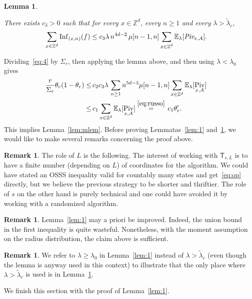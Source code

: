 \documentclass[10pt]{amsart}
\newtheorem{lemm}[theo]{Lemma}\newtheorem{prop}[theo]{Proposition}\newtheorem{coro}[theo]{Corollary}\newtheorem{conj}[theo]{Conjecture}
\theoremstyle{definition}\newtheorem{defi}[theo]{Definition}\newtheorem{rema}[theo]{Remark}\newtheorem{exam}[theo]{Example}\newtheorem{exem}[theo]{Example}\newtheorem{nota}[theo]{Notation}
\DeclareMathOperator{\Inf}{Inf}
\DeclareMathOperator{\Piv}{Piv}
\begin{document}
\begin{lemm}\label{lem:infcomp}

There exists $c_3>0$ such that for every $x\in {\mathbb Z}^d$, every $n\ge1$ and every $\lambda>\widetilde\lambda_c$,
\[
\sum_{x \in {\mathbb Z}^d} {\Inf}_{(x,n)}(f)\le c_3 \lambda \, n^{4d-2}\, \mu[n-1,n]\sum_{\substack{x\in{\mathbb Z}^d}} {\mathbb E}_\lambda [\emph{Piv}_{x,A}].
\]
\end{lemm}

Dividing~\eqref{eq:4} by $\Sigma_r$, then applying the lemma above, and then using $ \lambda < \lambda_0$ gives
\begin{align*}
\frac r{\Sigma_r}\theta_{r}(1-\theta_{r}) \leq \,&c_2c_3 \lambda \, \sum_{n\ge1} n^{5d-3}\mu[n-1,n] \sum_{x\in{\mathbb Z}^d}{\mathbb E}_\lambda [\Piv_{x,A}] \\
\le \,&c_1\sum_{x\in{\mathbb Z}^d}{\mathbb E}_\lambda [\Piv_{x,A}] \stackrel{\eqref{eq:russo}}{=}\, c_1 \theta'_r.
\end{align*}
This implies Lemma~\ref{lem:mlem}. Before proving Lemmatas~\ref{lem:1} and~\ref{lem:infcomp}, we would like to make several remarks concerning the proof above.

\begin{rema}
The role of $L$ is the following. The interest of working with $\mathsf T_{s,L}$ is to have a finite number (depending on $L$) of coordinates for the algorithm. We could have stated an OSSS inequality valid for countably many states and get~\eqref{eq:op} directly, but we believe the previous strategy to be shorter and thriftier. The role of $s$ on the other hand is purely technical and one could have avoided it by working with a randomized algorithm.
\end{rema}

\begin{rema}
Lemma~\ref{lem:1} may a priori be improved. Indeed, the union bound in the first inequality is quite wasteful. Nonetheless, with the moment assumption on the radius distribution, the claim above is sufficient.
\end{rema}


\begin{rema}
We refer to $\lambda\ge \lambda_0$ in Lemma~\ref{lem:1} instead of $\lambda>\widetilde\lambda_c$ (even though the lemma is anyway used in this context) to illustrate that the only place where $\lambda>\widetilde\lambda_c$ is used is in Lemma~\ref{lem:infcomp}.
\end{rema}

We finish this section with the proof of Lemma~\ref{lem:1}.
\end{document}
